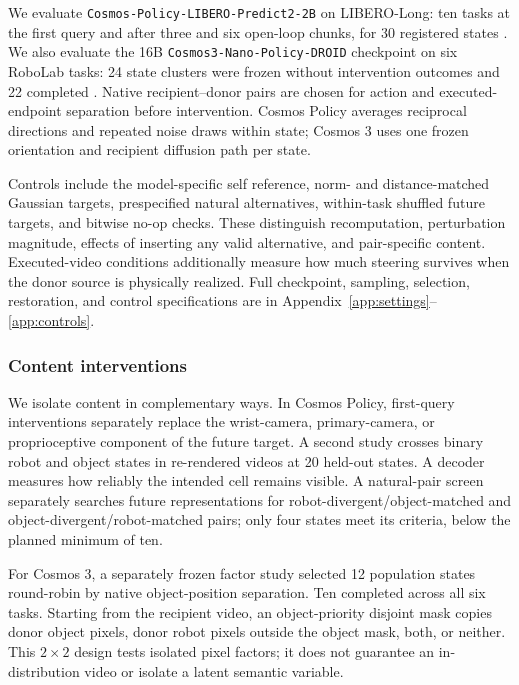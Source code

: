\documentclass{article}
\begin{document}
We evaluate \texttt{Cosmos-Policy-LIBERO-Predict2-2B} on LIBERO-Long: ten tasks at the first query and after three and six open-loop chunks, for 30 registered states \citep{kim2026cosmospolicy,liu2023libero}. We also evaluate the 16B \texttt{Cosmos3-Nano-Policy-DROID} checkpoint on six RoboLab tasks: 24 state clusters were frozen without intervention outcomes and 22 completed \citep{nvidia2026cosmos3,nvidia2026cosmos3droid,yang2026robolab}. Native recipient--donor pairs are chosen for action and executed-endpoint separation before intervention. Cosmos Policy averages reciprocal directions and repeated noise draws within state; Cosmos 3 uses one frozen orientation and recipient diffusion path per state.

Controls include the model-specific self reference, norm- and distance-matched Gaussian targets, prespecified natural alternatives, within-task shuffled future targets, and bitwise no-op checks. These distinguish recomputation, perturbation magnitude, effects of inserting any valid alternative, and pair-specific content. Executed-video conditions additionally measure how much steering survives when the donor source is physically realized. Full checkpoint, sampling, selection, restoration, and control specifications are in Appendix~\ref{app:settings}--\ref{app:controls}.

\subsubsection{Content interventions}

We isolate content in complementary ways. In Cosmos Policy, first-query interventions separately replace the wrist-camera, primary-camera, or proprioceptive component of the future target. A second study crosses binary robot and object states in re-rendered videos at 20 held-out states. A decoder measures how reliably the intended cell remains visible. A natural-pair screen separately searches future representations for robot-divergent/object-matched and object-divergent/robot-matched pairs; only four states meet its criteria, below the planned minimum of ten.

For Cosmos 3, a separately frozen factor study selected 12 population states round-robin by native object-position separation. Ten completed across all six tasks. Starting from the recipient video, an object-priority disjoint mask copies donor object pixels, donor robot pixels outside the object mask, both, or neither. This $2\times2$ design tests isolated pixel factors; it does not guarantee an in-distribution video or isolate a latent semantic variable.
\end{document}
